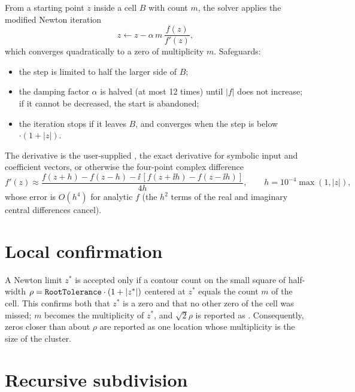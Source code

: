 From a starting point $z$ inside a cell $B$ with count $m$, the solver
applies the modified Newton iteration
\[
  z\leftarrow z-\alpha\, m\,\frac{f(z)}{f'(z)} ,
\]
which converges quadratically to a zero of multiplicity $m$. Safeguards:
\begin{itemize}
  \item the step is limited to half the larger side of $B$;
  \item the damping factor $\alpha$ is halved (at most 12 times) until
        $|f|$ does not increase; if it cannot be decreased, the start is
        abandoned;
  \item the iteration stops if it leaves $B$, and converges when the step is
        below $\cdot(1+|z|)$.
\end{itemize}
The derivative is the user-supplied , the exact derivative
for symbolic input and coefficient vectors, or otherwise the four-point
complex difference
\[
  f'(z)\approx\frac{f(z+h)-f(z-h)-\ii\,[f(z+\ii h)-f(z-\ii h)]}{4h},
  \qquad h=10^{-4}\max(1,|z|),
\]
whose error is $O(h^4)$ for analytic $f$ (the $h^2$ terms of the real and
imaginary central differences cancel).

\section{Local confirmation}\label{sec:confirm}

A Newton limit $z^\ast$ is accepted only if a contour count on the small
square of half-width $\rho=\texttt{RootTolerance}\cdot(1+|z^\ast|)$ centered
at $z^\ast$ equals the count $m$ of the cell. This confirms both that
$z^\ast$ is a zero and that no other zero of the cell was missed; $m$ becomes
the multiplicity of $z^\ast$, and $\sqrt2\rho$ is reported as
. Consequently, zeros closer than about $\rho$ are
reported as one location whose multiplicity is the size of the cluster.

\section{Recursive subdivision}\label{sec:subdivision}

